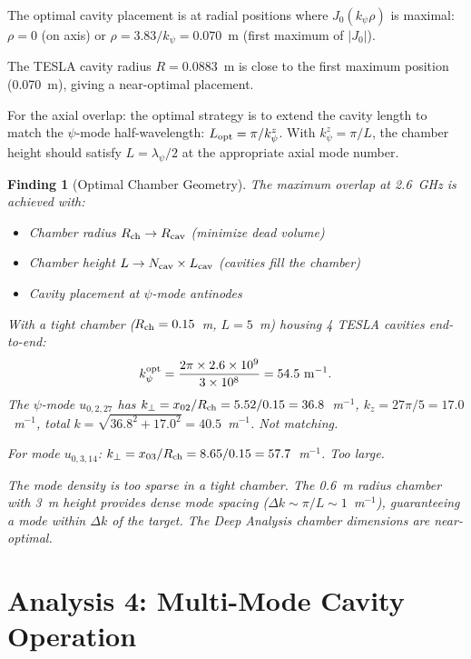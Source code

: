 \documentclass[11pt]{article}
\newtheorem{finding}{Finding}
\newcommand{\ee}[1]{\times 10^{#1}}
\begin{document}
The optimal cavity placement is at radial positions where
$J_0(k_\psi \rho)$ is maximal: $\rho = 0$ (on axis) or
$\rho = 3.83/k_\psi = 0.070$~m (first maximum of $|J_0|$).

The TESLA cavity radius $R = 0.0883$~m is close to the first
maximum position (0.070~m), giving a near-optimal placement.

For the axial overlap: the optimal strategy is to extend the
cavity length to match the $\psi$-mode half-wavelength:
$L_{\rm opt} = \pi/k_\psi^z$. With $k_\psi^z = \pi/L$,
the chamber height should satisfy $L = \lambda_\psi/2$
at the appropriate axial mode number.

\begin{finding}[Optimal Chamber Geometry]
\label{find:opt-chamber}
The maximum overlap at 2.6~GHz is achieved with:
\begin{itemize}[nosep]
\item Chamber radius $R_{\rm ch} \to R_{\rm cav}$
(minimize dead volume)
\item Chamber height $L \to N_{\rm cav} \times L_{\rm cav}$
(cavities fill the chamber)
\item Cavity placement at $\psi$-mode antinodes
\end{itemize}

With a tight chamber ($R_{\rm ch} = 0.15$~m, $L = 5$~m) housing
4 TESLA cavities end-to-end:
\begin{equation}
k_\psi^{\rm opt} = \frac{2\pi \times 2.6\ee{9}}{3\ee{8}} = 54.5\text{ m}^{-1}.
\end{equation}
The $\psi$-mode $u_{0,2,27}$ has $k_\perp = x_{02}/R_{\rm ch}
= 5.52/0.15 = 36.8$~m$^{-1}$, $k_z = 27\pi/5 = 17.0$~m$^{-1}$,
total $k = \sqrt{36.8^2 + 17.0^2} = 40.5$~m$^{-1}$. Not matching.

For mode $u_{0,3,14}$: $k_\perp = x_{03}/R_{\rm ch} = 8.65/0.15
= 57.7$~m$^{-1}$. Too large.

The mode density is too sparse in a tight chamber. The 0.6~m radius
chamber with 3~m height provides dense mode spacing
($\Delta k \sim \pi/L \sim 1$~m$^{-1}$), guaranteeing a mode
within $\Delta k$ of the target. The Deep Analysis chamber
dimensions are near-optimal.
\end{finding}

\section{Analysis 4: Multi-Mode Cavity Operation}
\label{sec:multi-mode}
\end{document}
